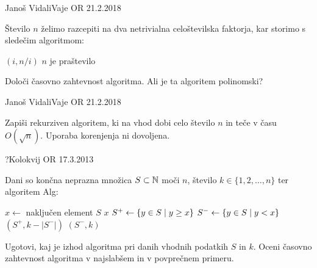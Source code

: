 \begin{naloga}{Janoš Vidali}{Vaje OR 21.2.2018}
\begin{vprasanje}
Število $n$ želimo razcepiti
na dva netrivialna celoštevilska faktorja,
kar storimo s sledečim algoritmom:
\begin{small}
\begin{algorithmic}
            \State \Return $(i, n/i)$
        \EndIf
    \EndFor
    \State \Return $n$ je praštevilo
\EndFunction
\end{algorithmic}
\end{small}
Določi časovno zahtevnost algoritma.
Ali je ta algoritem polinomski?

\end{vprasanje}
\begin{odgovor}
\end{odgovor}
\end{naloga}


\begin{naloga}{Janoš Vidali}{Vaje OR 21.2.2018}
\begin{vprasanje}
Zapiši rekurziven algoritem,
ki na vhod dobi celo število $n$ in teče v času $O(\sqrt{n})$.
Uporaba korenjenja ni dovoljena.

\end{vprasanje}
\begin{odgovor}
\end{odgovor}
\end{naloga}


\begin{naloga}{?}{Kolokvij OR 17.3.2013}
\begin{vprasanje}
Dani so končna neprazna množica $S \subset \mathbb{N}$ moči $n$,
število $k \in \{1, 2, \dots, n\}$ ter algoritem {\sc Alg}:
\begin{small}
\begin{algorithmic}
    \State $x \gets$ naključen element $S$
        \State \Return $x$
    \Else
        \State $S^+ \gets \left\{ y \in S \; \middle| \; y \ge x \right\}$
        \State $S^- \gets \left\{ y \in S \; \middle| \; y < x \right\}$
            \State {}$(S^+, k - |S^-|)$
        \Else
            \State {}$(S^-, k)$
        \EndIf
    \EndIf
\EndFunction
\end{algorithmic}
\end{small}
Ugotovi, kaj je izhod algoritma pri danih vhodnih podatkih $S$ in $k$.
Oceni časovno zahtevnost algoritma v najslabšem in v povprečnem primeru.
\end{vprasanje}
\begin{odgovor}
\end{odgovor}
\end{naloga}
